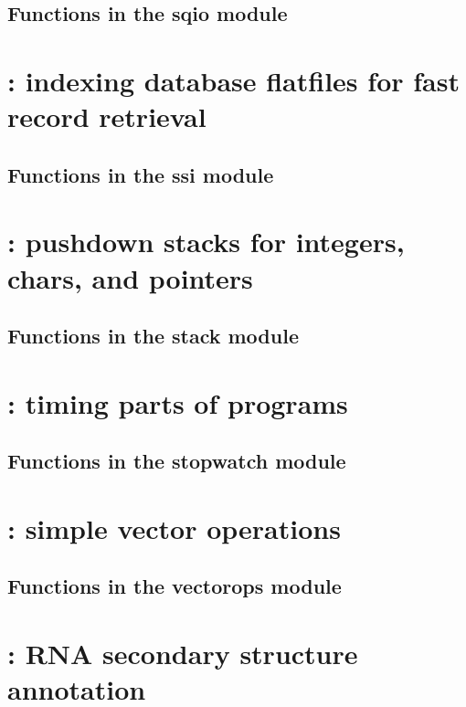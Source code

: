 \documentclass[10pt]{book}
\begin{document}
\subsection{Functions in the sqio module}


\newpage
\section{: indexing database flatfiles for fast record retrieval}

\subsection{Functions in the ssi module}


\newpage
\section{: pushdown stacks for integers, chars, and pointers}

\subsection{Functions in the stack module}


\newpage
\section{: timing parts of programs}

\subsection{Functions in the stopwatch module}


\newpage
\section{: simple vector operations}

\subsection{Functions in the vectorops module}


\newpage
\section{: RNA secondary structure annotation}

\end{document}
